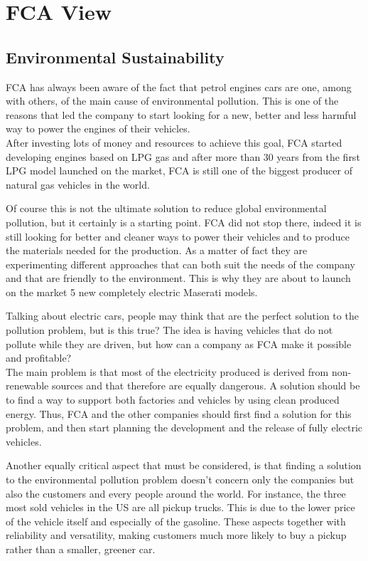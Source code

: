 \section{FCA View}
\subsection{Environmental Sustainability}
FCA has always been aware of the fact that petrol engines cars are one, among with others, of the main cause of environmental pollution. This is one of the reasons that led the company to start looking for a new, better and less harmful way to power the engines of their vehicles.\\
After investing lots of money and resources to achieve this goal, FCA started developing engines based on LPG gas and after more than 30 years from the first LPG model launched on the market, FCA is still one of the biggest producer of natural gas vehicles in the world\cite{FCA_sustainability}.

Of course this is not the ultimate solution to reduce global environmental pollution, but it certainly is a starting point. FCA did not stop there, indeed it is still looking for better and cleaner ways to power their vehicles and to produce the materials needed for the production. As a matter of fact they are experimenting different approaches that can both suit the needs of the company and that are friendly to the environment. This is why they are about to launch on the market 5 new completely electric Maserati models\cite{Maserati_electric}.

Talking about electric cars, people may think that are the perfect solution to the pollution problem, but is this true?
The idea is having vehicles that do not pollute while they are driven, but how can a company as FCA make it possible and profitable?\\
The main problem is that most of the electricity produced is derived from non-renewable sources and that therefore are equally dangerous. A solution should be to find a way to support both factories and vehicles by using clean produced energy. Thus, FCA and the other companies should first find a solution for this problem, and then start planning the development and the release of fully electric vehicles.

Another equally critical aspect that must be considered, is that finding a solution to the environmental pollution problem doesn't concern only the companies but also the customers and every people around the world. For instance, the three most sold vehicles in the US are all pickup trucks\cite{US_best-selling-vehicle}. This is due to the lower price of the vehicle itself and especially of the gasoline. These aspects together with reliability and versatility, making customers much more likely to buy a pickup rather than a smaller, greener car.

